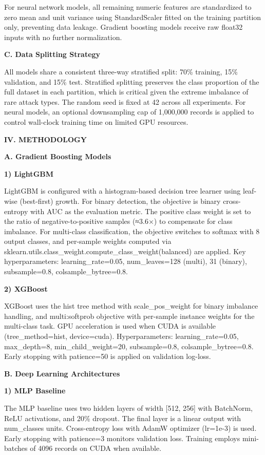 \documentclass[
  journal,
  10pt]{IEEEtran}
\begin{document}
For neural network models, all remaining numeric features are
standardized to zero mean and unit variance using StandardScaler fitted
on the training partition only, preventing data leakage. Gradient
boosting models receive raw float32 inputs with no further
normalization.

\textbf{C. Data Splitting Strategy}

All models share a consistent three-way stratified split: 70\% training,
15\% validation, and 15\% test. Stratified splitting preserves the class
proportion of the full dataset in each partition, which is critical
given the extreme imbalance of rare attack types. The random seed is
fixed at 42 across all experiments. For neural models, an optional
downsampling cap of 1,000,000 records is applied to control wall-clock
training time on limited GPU resources.

\textbf{IV. METHODOLOGY}

\textbf{A. Gradient Boosting Models}

\textbf{1) LightGBM}

LightGBM is configured with a histogram-based decision tree learner
using leaf-wise (best-first) growth. For binary detection, the objective
is binary cross-entropy with AUC as the evaluation metric. The positive
class weight is set to the ratio of negative-to-positive samples (≈3.6×)
to compensate for class imbalance. For multi-class classification, the
objective switches to softmax with 8 output classes, and per-sample
weights computed via
sklearn.utils.class\_weight.compute\_class\_weight(\textquotesingle balanced\textquotesingle)
are applied. Key hyperparameters: learning\_rate=0.05, num\_leaves=128
(multi), 31 (binary), subsample=0.8, colsample\_bytree=0.8.

\textbf{2) XGBoost}

XGBoost uses the hist tree method with scale\_pos\_weight for binary
imbalance handling, and multi:softprob objective with per-sample
instance weights for the multi-class task. GPU acceleration is used when
CUDA is available (tree\_method=\textquotesingle hist\textquotesingle,
device=\textquotesingle cuda\textquotesingle). Hyperparameters:
learning\_rate=0.05, max\_depth=8, min\_child\_weight=20, subsample=0.8,
colsample\_bytree=0.8. Early stopping with patience=50 is applied on
validation log-loss.

\textbf{B. Deep Learning Architectures}

\textbf{1) MLP Baseline}

The MLP baseline uses two hidden layers of width {[}512, 256{]} with
BatchNorm, ReLU activations, and 20\% dropout. The final layer is a
linear output with num\_classes units. Cross-entropy loss with AdamW
optimizer (lr=1e-3) is used. Early stopping with patience=3 monitors
validation loss. Training employs mini-batches of 4096 records on CUDA
when available.
\end{document}
